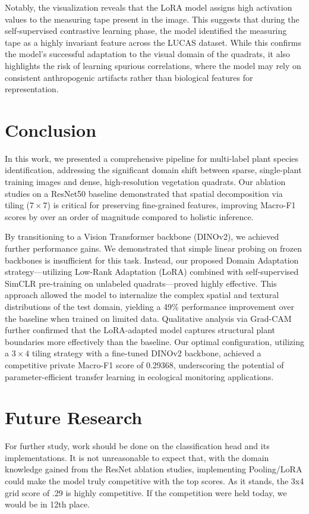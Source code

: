 \documentclass[conference]{IEEEtran}
\begin{document}
Notably, the visualization reveals that the LoRA model assigns high activation values to the measuring tape present in the image. This suggests that during the self-supervised contrastive learning phase, the model identified the measuring tape as a highly invariant feature across the LUCAS dataset. While this confirms the model's successful adaptation to the visual domain of the quadrats, it also highlights the risk of learning spurious correlations, where the model may rely on consistent anthropogenic artifacts rather than biological features for representation.

\section{Conclusion}
In this work, we presented a comprehensive pipeline for multi-label plant species identification, addressing the significant domain shift between sparse, single-plant training images and dense, high-resolution vegetation quadrats. Our ablation studies on a ResNet50 baseline demonstrated that spatial decomposition via tiling ($7\times7$) is critical for preserving fine-grained features, improving Macro-F1 scores by over an order of magnitude compared to holistic inference.

By transitioning to a Vision Transformer backbone (DINOv2), we achieved further performance gains. We demonstrated that simple linear probing on frozen backbones is insufficient for this task. Instead, our proposed Domain Adaptation strategy—utilizing Low-Rank Adaptation (LoRA) combined with self-supervised SimCLR pre-training on unlabeled quadrats—proved highly effective. This approach allowed the model to internalize the complex spatial and textural distributions of the test domain, yielding a 49\% performance improvement over the baseline when trained on limited data. Qualitative analysis via Grad-CAM further confirmed that the LoRA-adapted model captures structural plant boundaries more effectively than the baseline. Our optimal configuration, utilizing a $3\times4$ tiling strategy with a fine-tuned DINOv2 backbone, achieved a competitive private Macro-F1 score of 0.29368, underscoring the potential of parameter-efficient transfer learning in ecological monitoring applications.

\section{Future Research}

For further study, work should be done on the classification head and its implementations. It is not unreasonable to expect that, with the domain knowledge gained from the ResNet ablation studies, implementing Pooling/LoRA could make the model truly competitive with the top scores. As it stands, the 3x4 grid score of .29 is highly competitive. If the competition were held today, we would be in 12th place.
\end{document}
